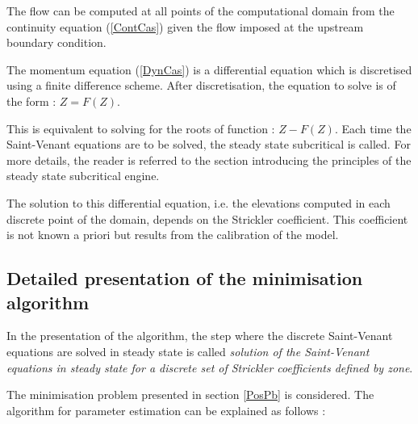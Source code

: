 The flow can be computed at all points of the computational domain from the continuity equation (\ref{ContCas}) given the flow imposed at the upstream boundary condition.

The momentum equation (\ref{DynCas}) is a differential equation which is discretised using a finite difference scheme. After discretisation, the equation to solve is of the form : $Z=F(Z)$.

This is equivalent to solving for the roots of function : $Z-F(Z)$. Each time the Saint-Venant equations are to be solved, the steady state subcritical is called. For more details, the reader is referred to the section introducing the principles of the steady state subcritical engine.

The solution to this differential equation, i.e. the elevations computed in each discrete point of the domain, depends on the Strickler coefficient. This coefficient is not known a priori but results from the calibration of the model.

\subsection{Detailed presentation of the minimisation algorithm}

In the presentation of the algorithm, the step where the discrete Saint-Venant equations are solved in steady state is called \textit{solution of the Saint-Venant equations in steady state for a discrete set of Strickler coefficients defined by zone}.

The minimisation problem presented in section \ref{PosPb} is considered. The algorithm for parameter estimation can be explained as follows :

